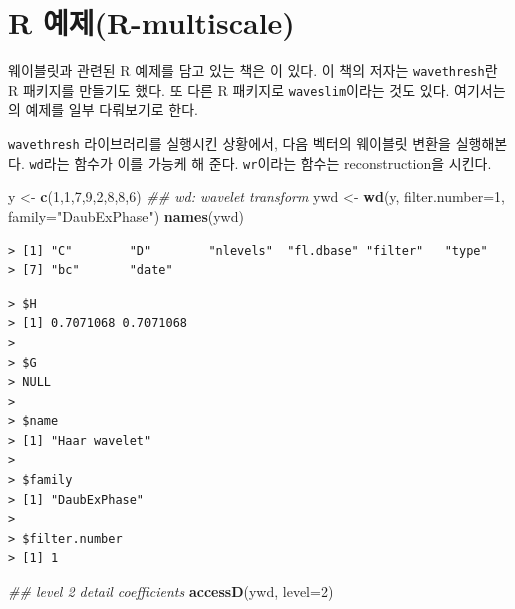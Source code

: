 \documentclass[b5paper,]{scrbook}
\makeatletter
\newenvironment{Shaded}{\begin{snugshade}}{\end{snugshade}}
\newcommand{\CommentTok}[1]{\textcolor[rgb]{0.56,0.35,0.01}{\textit{#1}}}
\newcommand{\DataTypeTok}[1]{\textcolor[rgb]{0.13,0.29,0.53}{#1}}
\newcommand{\DecValTok}[1]{\textcolor[rgb]{0.00,0.00,0.81}{#1}}
\newcommand{\KeywordTok}[1]{\textcolor[rgb]{0.13,0.29,0.53}{\textbf{#1}}}
\newcommand{\NormalTok}[1]{#1}
\newcommand{\OperatorTok}[1]{\textcolor[rgb]{0.81,0.36,0.00}{\textbf{#1}}}
\newcommand{\StringTok}[1]{\textcolor[rgb]{0.31,0.60,0.02}{#1}}
\theoremstyle{plain}
\theoremstyle{definition}
\numberwithin{equation}{section}
\newenvironment{kframe}{%
\medskip{}
\setlength{\fboxsep}{.8em}
 \def\at@end@of@kframe{}%
 \ifinner\ifhmode%
  \def\at@end@of@kframe{\end{minipage}}%
  \begin{minipage}{\columnwidth}%
 \fi\fi%
 \def\FrameCommand##1{\hskip\@totalleftmargin \hskip-\fboxsep
 \colorbox{shadecolor}{##1}\hskip-\fboxsep
     \hskip-\linewidth \hskip-\@totalleftmargin \hskip\columnwidth}%
 \MakeFramed {\advance\hsize-\width
   \@totalleftmargin\z@ \linewidth\hsize
   \@setminipage}}%
 {\par\unskip\endMakeFramed%
 \at@end@of@kframe}
\renewenvironment{Shaded}{\begin{kframe}}{\end{kframe}}
\makeatother
\begin{document}
\hypertarget{r-r-multiscale}{%
\section{R 예제(R-multiscale)}\label{r-r-multiscale}}

웨이블릿과 관련된 R 예제를 담고 있는 책은 \citep{Nason2010}이 있다. 이 책의 저자는 \texttt{wavethresh}란 R 패키지를 만들기도 했다. 또 다른 R 패키지로 \texttt{waveslim}이라는 것도 있다. 여기서는 \citep{Nason2010}의 예제를 일부 다뤄보기로 한다.

\texttt{wavethresh} 라이브러리를 실행시킨 상황에서, 다음 벡터의 웨이블릿 변환을 실행해본다. \texttt{wd}라는 함수가 이를 가능케 해 준다. \texttt{wr}이라는 함수는 reconstruction을 시킨다.

\begin{Shaded}
\begin{Highlighting}[]
\NormalTok{y <-}\StringTok{ }\KeywordTok{c}\NormalTok{(}\DecValTok{1}\NormalTok{,}\DecValTok{1}\NormalTok{,}\DecValTok{7}\NormalTok{,}\DecValTok{9}\NormalTok{,}\DecValTok{2}\NormalTok{,}\DecValTok{8}\NormalTok{,}\DecValTok{8}\NormalTok{,}\DecValTok{6}\NormalTok{)}
\CommentTok{## wd: wavelet transform}
\NormalTok{ywd <-}\StringTok{ }\KeywordTok{wd}\NormalTok{(y, }\DataTypeTok{filter.number=}\DecValTok{1}\NormalTok{, }\DataTypeTok{family=}\StringTok{"DaubExPhase"}\NormalTok{)}
\KeywordTok{names}\NormalTok{(ywd)}
\end{Highlighting}
\end{Shaded}

\begin{verbatim}
> [1] "C"        "D"        "nlevels"  "fl.dbase" "filter"   "type"    
> [7] "bc"       "date"
\end{verbatim}

\begin{Shaded}
\end{Shaded}

\begin{verbatim}
> $H
> [1] 0.7071068 0.7071068
> 
> $G
> NULL
> 
> $name
> [1] "Haar wavelet"
> 
> $family
> [1] "DaubExPhase"
> 
> $filter.number
> [1] 1
\end{verbatim}

\begin{Shaded}
\begin{Highlighting}[]
\CommentTok{## level 2 detail coefficients}
\KeywordTok{accessD}\NormalTok{(ywd, }\DataTypeTok{level=}\DecValTok{2}\NormalTok{)}
\end{Highlighting}
\end{Shaded}
\end{document}
